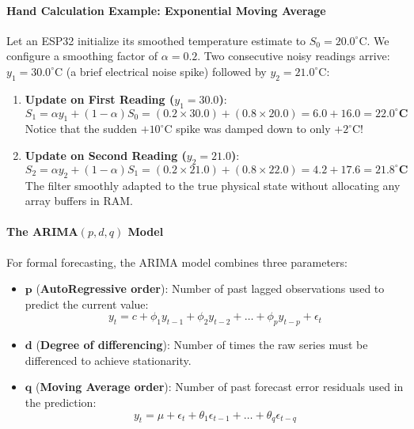 \paragraph{Hand Calculation Example: Exponential Moving Average}
Let an ESP32 initialize its smoothed temperature estimate to $S_0 = 20.0^\circ\text{C}$. We configure a smoothing factor of $\alpha = 0.2$. Two consecutive noisy readings arrive: $y_1 = 30.0^\circ\text{C}$ (a brief electrical noise spike) followed by $y_2 = 21.0^\circ\text{C}$:
\begin{enumerate}
    \item \textbf{Update on First Reading ($y_1 = 30.0$)}:
    \begin{equation*}
    S_1 = \alpha y_1 + (1 - \alpha) S_0 = (0.2 \times 30.0) + (0.8 \times 20.0) = 6.0 + 16.0 = \mathbf{22.0^\circ\text{C}}
    \end{equation*}
    Notice that the sudden $+10^\circ\text{C}$ spike was damped down to only $+2^\circ\text{C}$!
    \item \textbf{Update on Second Reading ($y_2 = 21.0$)}:
    \begin{equation*}
    S_2 = \alpha y_2 + (1 - \alpha) S_1 = (0.2 \times 21.0) + (0.8 \times 22.0) = 4.2 + 17.6 = \mathbf{21.8^\circ\text{C}}
    \end{equation*}
    The filter smoothly adapted to the true physical state without allocating any array buffers in RAM.
\end{enumerate}

\paragraph{The ARIMA$(p, d, q)$ Model}
For formal forecasting, the ARIMA model combines three parameters:
\begin{itemize}
    \item $\mathbf{p}$ (\textbf{AutoRegressive order}): Number of past lagged observations used to predict the current value:
    \begin{equation*}
    y_t = c + \phi_1 y_{t-1} + \phi_2 y_{t-2} + \dots + \phi_p y_{t-p} + \epsilon_t
    \end{equation*}
    \item $\mathbf{d}$ (\textbf{Degree of differencing}): Number of times the raw series must be differenced to achieve stationarity.
    \item $\mathbf{q}$ (\textbf{Moving Average order}): Number of past forecast error residuals used in the prediction:
    \begin{equation*}
    y_t = \mu + \epsilon_t + \theta_1 \epsilon_{t-1} + \dots + \theta_q \epsilon_{t-q}
    \end{equation*}
\end{itemize}


